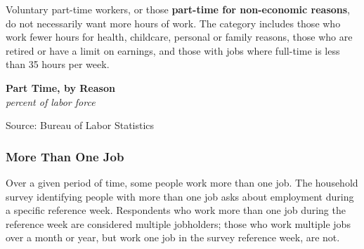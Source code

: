 \documentclass{report}
\makeatletter
\newcommand{\tbllink}[1]{\href{https://raw.githubusercontent.com/bdecon/US-chartbook/master/chartbook/data/#1}{\faTable}}
\newcommand*\short[1]{\expandafter\@gobbletwo\number\numexpr#1\relax}
\newcommand{\absnode}[3]{\node[below right, align=left] at (axis cs: #1,#2) {#3};}
\newcommand{\shdateaxisticks}{
		date coordinates in=x, axis line style={draw=none},
		xmax={2023-11-30},
		max space between ticks=40,	    
		xtick={{1990-01-01}, {1995-01-01}, {2000-01-01}, 
			{2005-01-01}, {2010-01-01}, {2015-01-01}, {2020-01-01}},
		minor xtick={},
		enlarge y limits={0.06}, enlarge x limits={0.01},
		xticklabel style={align=center, yshift=-2pt}, tick label style={inner sep=0pt},
		}
\newcommand{\bbar}[2]{extra #1 ticks = {{#2}}, extra #1 tick labels = ,
		extra #1 tick style = {grid=major, grid style={thick, black!25}},}
\newcommand{\stdline}[4]{\addplot[very thick, no markers, color=#1] 
		table [x=#2, y=#3, col sep=comma] {#4};	}
\newcommand{\rebars}{
		\fill[color=black!10] (axis cs:{2007-12-01},\pgfkeysvalueof{/pgfplots/ymin}) rectangle 
			(axis cs:{2009-07-01}, \pgfkeysvalueof{/pgfplots/ymax});
		\fill[color=black!10] (axis cs:{2001-03-01},\pgfkeysvalueof{/pgfplots/ymin}) rectangle 
			(axis cs:{2001-11-01}, \pgfkeysvalueof{/pgfplots/ymax});
		\fill[color=black!10] (axis cs:{2020-02-01},\pgfkeysvalueof{/pgfplots/ymin}) rectangle 
			(axis cs:{2020-05-01}, \pgfkeysvalueof{/pgfplots/ymax});}
\makeatother
\begin{document}
{\begin{minipage}{0.76\textwidth}
Voluntary part-time workers, or those \textbf{part-time for non-economic reasons}, do not necessarily want more hours of work. The category includes those who work fewer hours for health, childcare, personal or family reasons, those who are retired or have a limit on earnings, and those with jobs where full-time is less than 35 hours per week. 
\end{minipage}

\begin{minipage}{0.43\textwidth}
\normalsize \textbf{Part Time, by Reason}\\
\footnotesize{\textit{percent of labor force}}
\vspace{4.2cm}

\hspace{2mm} 

\footnotesize{Source: Bureau of Labor Statistics} \hfill \tbllink{parttime.csv} \ \ 
\end{minipage}\hspace{5mm}
\begin{minipage}{0.29\textwidth}
\small 
\end{minipage}
\vspace{1mm}

\begin{minipage}{0.76\textwidth}
\subsubsection*{More Than One Job}
\small Over a given period of time, some people work more than one job. The household survey identifying people with more than one job asks about employment during a specific reference week. Respondents who work more than one job during the reference week are considered multiple jobholders; those who work multiple jobs over a month or year, but work one job in the survey reference week, are not. 
\end{minipage}

}
\end{document}
